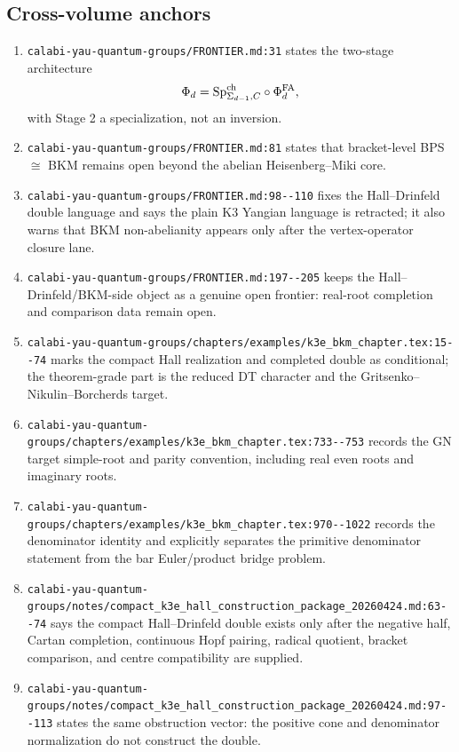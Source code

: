 \subsection{Cross-volume anchors}

\begin{enumerate}
\item \verb|calabi-yau-quantum-groups/FRONTIER.md:31| states the
two-stage architecture
\[
\Phi_d=\mathrm{Sp}^{\mathrm{ch}}_{\Sigma_{d-1},C}\circ\Phi^{\mathrm{FA}}_d,
\]
with Stage 2 a specialization, not an inversion.
\item \verb|calabi-yau-quantum-groups/FRONTIER.md:81| states that
bracket-level BPS \(\cong\) BKM remains open beyond the abelian
Heisenberg--Miki core.
\item \verb|calabi-yau-quantum-groups/FRONTIER.md:98--110| fixes the
Hall--Drinfeld double language and says the plain K3 Yangian language is
retracted; it also warns that BKM non-abelianity appears only after the
vertex-operator closure lane.
\item \verb|calabi-yau-quantum-groups/FRONTIER.md:197--205| keeps the
Hall--Drinfeld/BKM-side object as a genuine open frontier: real-root
completion and comparison data remain open.
\item \verb|calabi-yau-quantum-groups/chapters/examples/k3e_bkm_chapter.tex:15--74|
marks the compact Hall realization and completed double as conditional;
the theorem-grade part is the reduced DT character and the
Gritsenko--Nikulin--Borcherds target.
\item \verb|calabi-yau-quantum-groups/chapters/examples/k3e_bkm_chapter.tex:733--753|
records the GN target simple-root and parity convention, including real
even roots and imaginary roots.
\item \verb|calabi-yau-quantum-groups/chapters/examples/k3e_bkm_chapter.tex:970--1022|
records the denominator identity and explicitly separates the primitive
denominator statement from the bar Euler/product bridge problem.
\item \verb|calabi-yau-quantum-groups/notes/compact_k3e_hall_construction_package_20260424.md:63--74|
says the compact Hall--Drinfeld double exists only after the negative
half, Cartan completion, continuous Hopf pairing, radical quotient,
bracket comparison, and centre compatibility are supplied.
\item \verb|calabi-yau-quantum-groups/notes/compact_k3e_hall_construction_package_20260424.md:97--113|
states the same obstruction vector: the positive cone and denominator
normalization do not construct the double.

\end{enumerate}
